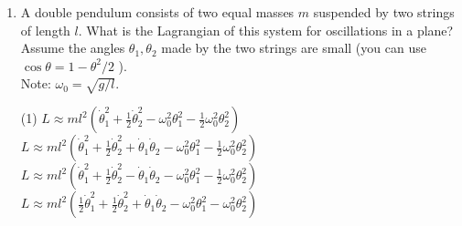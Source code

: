 \begin{enumerate}
\begin{answer}
\begin{align*}
	\text{canonical momentum is }p&=m \dot{q}
	\intertext{ and equation of motion is given by }\frac{d}{d t}\left(\frac{\partial L}{\partial \dot{q}}\right)-\left(\frac{\partial L}{\partial q}\right)&=0 \Rightarrow m \ddot{q}+m \omega^{2} q=0\\
	\text{For Lagrangian }L&=L_{0}+\alpha q\left(\frac{d q}{d t}\right) \Rightarrow L\\&=\frac{1}{2} m\left(\frac{d q}{d t}\right)^{2}-\frac{1}{2} m \omega^{2} q^{2}+\alpha q \dot{q}\\
	\text{Canonical momentum is }p&=m \dot{q}+\alpha q\\
	\text{Equation of motion is,}\\
	\frac{d}{d t}\left(\frac{\partial L}{\partial \dot{q}}\right)-\left(\frac{\partial L}{\partial q}\right)&=0 \Rightarrow m \ddot{q}+m \omega^{2} q=0
	\end{align*}
	So the correct answer is \textbf{Option (B)}
\end{answer}
	\item  A double pendulum consists of two equal masses $m$ suspended by two strings of length $l$. What is the Lagrangian of this system for oscillations in a plane? Assume the angles $\theta_{1}, \theta_{2}$ made by the two strings are small (you can use $\cos \theta=1-\theta^{2} / 2$ ).\\
	Note: $\omega_{0}=\sqrt{g / l}$.
	{}
	\begin{tasks}(1)
		\task[\textbf{A.}] $L \approx m l^{2}\left(\dot{\theta}_{1}^{2}+\frac{1}{2} \dot{\theta}_{2}^{2}-\omega_{0}^{2} \theta_{1}^{2}-\frac{1}{2} \omega_{0}^{2} \theta_{2}^{2}\right)$
		\task[\textbf{B.}]  $L \approx m l^{2}\left(\dot{\theta}_{1}^{2}+\frac{1}{2} \dot{\theta}_{2}^{2}+\dot{\theta}_{1} \dot{\theta}_{2}-\omega_{0}^{2} \theta_{1}^{2}-\frac{1}{2} \omega_{0}^{2} \theta_{2}^{2}\right)$
		\task[\textbf{C.}] $L \approx m l^{2}\left(\dot{\theta}_{1}^{2}+\frac{1}{2} \dot{\theta}_{2}^{2}-\dot{\theta}_{1} \dot{\theta}_{2}-\omega_{0}^{2} \theta_{1}^{2}-\frac{1}{2} \omega_{0}^{2} \theta_{2}^{2}\right)$
		\task[\textbf{D.}]  $L \approx m l^{2}\left(\frac{1}{2} \dot{\theta}_{1}^{2}+\frac{1}{2} \dot{\theta}_{2}^{2}+\dot{\theta}_{1} \dot{\theta}_{2}-\omega_{0}^{2} \theta_{1}^{2}-\omega_{0}^{2} \theta_{2}^{2}\right)$
	\end{tasks}
\begin{answer}$\left. \right. $\\
	\begin{minipage}{0.45\textwidth}
		\begin{align*}

\end{align*}
\end{minipage}
\end{answer}
\end{enumerate}
